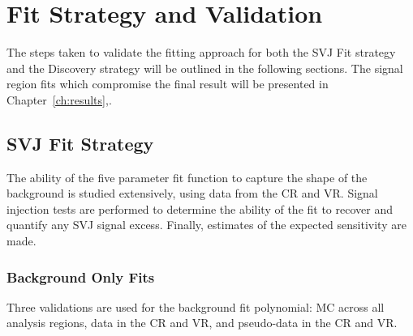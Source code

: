 \section{Fit Strategy and Validation}
\label{sec:fit_strategy}

The steps taken to validate the fitting approach for both the SVJ Fit strategy and the Discovery strategy will be outlined in the following sections. The signal region fits which compromise the final result will be presented in Chapter~\ref{ch:results},.

\subsection{SVJ Fit Strategy}
\label{subsec:fit_exclusion}

The ability of the five parameter fit function to capture the shape of the background is studied extensively, using data from the CR and VR. Signal injection tests are performed to determine the ability of the fit to recover and quantify any SVJ signal excess. Finally, estimates of the expected sensitivity are made. 


\subsubsection{Background Only Fits}
\label{subsec:fit_bkgonly}

Three validations are used for the background fit polynomial: MC across all analysis regions, data in the CR and VR, and pseudo-data in the CR and VR. 

